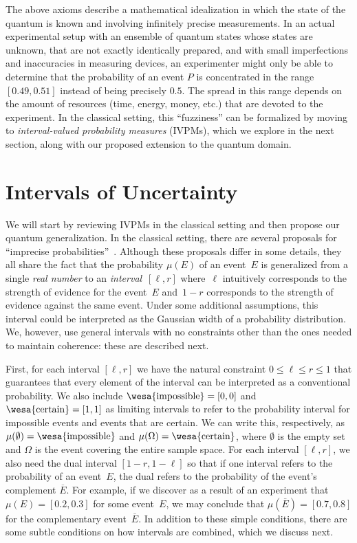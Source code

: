 \documentclass[english,reprint, aps, prl,superscriptaddress, showpacs,
showkeys, longbibliography, amsmath, amssymb, floatfix]{revtex4-1}
\theoremstyle{plain}
\theoremstyle{definition}
\newcommand{\imposs}{{\text{\wesa{impossible}}}}
\newcommand{\necess}{{\text{\wesa{certain}}}}
\begin{document}
The above axioms describe a mathematical idealization in which the
state of the quantum is known and involving infinitely precise
measurements. In an actual experimental setup with an ensemble of
quantum states whose states are unknown, that are not exactly
identically prepared, and with small imperfections and inaccuracies in
measuring devices, an experimenter might only be able to determine
that the probability of an event $P$ is concentrated in the range
$[0.49,0.51]$ instead of being precisely $0.5$. The spread in this
range depends on the amount of resources (time, energy, money, etc.)
that are devoted to the experiment. In the classical setting, this
``fuzziness'' can be formalized by moving to \emph{interval-valued
  probability measures} (IVPMs), which we explore in the next section,
along with our proposed extension to the quantum domain.

\section{Intervals of Uncertainty}
\label{sec:Interval-Uncertainty}

We will start by reviewing IVPMs in the classical setting and then
propose our quantum generalization. In the classical setting, there
are several proposals for ``imprecise
probabilities''~\citep{Dempster1967,Shafer1976,GilboaSchmeidler1994,Marinacci1999,Weichselberger2000,JamisonLodwick2004,HuberRonchetti2009,Grabisch2016}.
Although these proposals differ in some details, they all share the
fact that the probability $\mu(E)$ of an event~$E$ is generalized from
a single \emph{real number} to an \emph{interval}~$[\ell,r]$
where~$\ell$ intuitively corresponds to the strength of evidence for
the event~$E$ and~$1-r$ corresponds to the strength of evidence
against the same event. Under some additional assumptions, this
interval could be interpreted as the Gaussian width of a probability
distribution. We, however, use general intervals with no constraints
other than the ones needed to maintain coherence: these are described
next.

First, for each interval $[\ell,r]$ we have the natural constraint
$0 \leq \ell \leq r \leq 1$ that guarantees that every element of the
interval can be interpreted as a conventional probability. We also
include $\imposs=[0,0]$ and $\necess=[1,1]$ as limiting intervals to
refer to the probability interval for impossible events
and events that are certain. We can write this, respectively, as
$\mu(\emptyset)=\imposs$ and $\mu(\Omega)=\necess$, where $\emptyset$ is
the empty set and $\Omega$ is the event covering the entire
sample space.  For each interval $[\ell,r]$, we also need the dual
interval $[1-r,1-\ell]$ so that if one interval refers to the
probability of an event~$E$, the dual refers to the probability of the
event's complement $\overline{E}$.  For example, if we discover as a
result of an experiment that $\mu(E) = [0.2,0.3]$ for some event~$E$,
we may conclude that $\mu(\overline{E}) = [0.7,0.8]$ for the
complementary event~$\overline{E}$. In addition to these simple
conditions, there are some subtle conditions on how intervals are
combined, which we discuss next.
\end{document}
